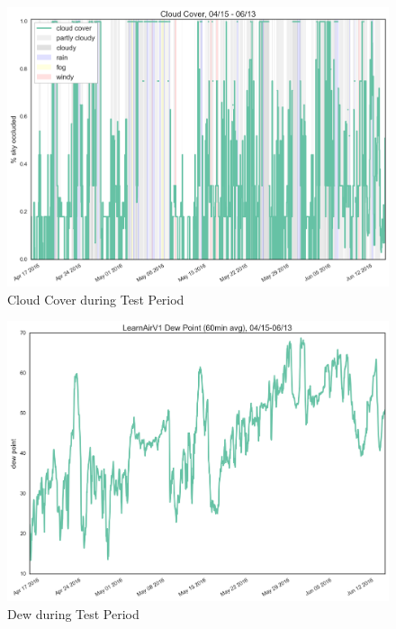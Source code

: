 \begin{figure}[htb]
 	\includegraphics[width=\textwidth]{figs/cloud_cover}               
 	 \caption{Cloud Cover during Test Period}
  	\label{fig:cloud_cover}
\end{figure}

\begin{figure}[htb]
 	\includegraphics[width=\textwidth]{figs/dew}               
 	 \caption{Dew during Test Period}
  	\label{fig:dew}
\end{figure}

